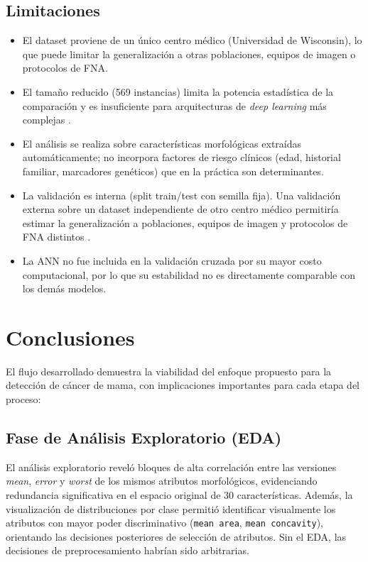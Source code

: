 \documentclass[journal]{IEEEtran}
\begin{document}
\subsection{Limitaciones}
\begin{itemize}
  \item El dataset proviene de un único centro médico
  (Universidad de Wisconsin), lo que puede limitar la
  generalización a otras poblaciones, equipos de imagen
  o protocolos de FNA.

  \item El tamaño reducido (569 instancias) limita la
  potencia estadística de la comparación y es insuficiente
  para arquitecturas de \textit{deep learning} más complejas \cite{chougrad2018}.

  \item El análisis se realiza sobre características
  morfológicas extraídas automáticamente; no incorpora
  factores de riesgo clínicos (edad, historial familiar,
  marcadores genéticos) que en la práctica son determinantes.

  \item La validación es interna (split train/test con
  semilla fija). Una validación externa sobre un dataset
  independiente de otro centro médico permitiría estimar la generalización a poblaciones, equipos de imagen y protocolos de FNA distintos \cite{hastie2009}.

  \item La ANN no fue incluida en la validación cruzada
  por su mayor costo computacional, por lo que su
  estabilidad no es directamente comparable con los
  demás modelos.
\end{itemize}

\section{Conclusiones}

El flujo desarrollado demuestra la viabilidad del enfoque propuesto para la detección de cáncer de mama, con implicaciones importantes para cada etapa del proceso: 

\subsection{Fase de Análisis Exploratorio (EDA)}
El análisis exploratorio reveló bloques de alta correlación entre las versiones \textit{mean}, \textit{error} y \textit{worst} de los mismos atributos morfológicos, evidenciando redundancia significativa en el espacio original de 30 características. Además, la visualización de distribuciones por clase permitió identificar visualmente los atributos con mayor poder discriminativo (\texttt{mean area}, \texttt{mean concavity}), orientando las decisiones posteriores de selección de atributos. Sin el EDA, las decisiones de preprocesamiento habrían sido arbitrarias.
\end{document}
